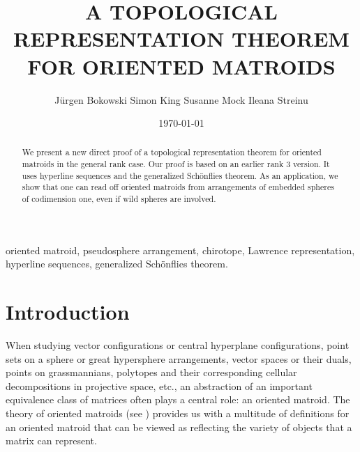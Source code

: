 \documentclass[a4paper]{amsart}
\theoremstyle{definition}
\theoremstyle{remark}
\begin{document}


\title{{\bf 
A TOPOLOGICAL REPRESENTATION THEOREM\\
 FOR ORIENTED MATROIDS\\}
}
\setcounter{footnote}{-1}
\author{
J\"urgen Bokowski \hspace{4mm} Simon King \hspace{4mm}  Susanne Mock
\hspace{4mm}
Ileana Streinu
} %

\date{\today}

\begin{abstract}
We present a new direct proof of 
a topological representation theorem for oriented matroids
in the general rank case. Our proof is based on an earlier rank 3 version.
It uses hyperline sequences and the generalized Sch{\"o}nflies theorem.
As an application, we show that one can read off oriented matroids
from arrangements of embedded spheres of codimension one, even if wild spheres are involved.
\end{abstract}

\maketitle

 oriented matroid, pseudosphere arrangement, 
chirotope, Lawrence representation, hyperline sequences, 
generalized Sch{\"o}nflies theorem.


\section{Introduction}
\label{introduction}

When studying vector configurations or central hyperplane configurations,
point sets on a sphere or great hypersphere arrangements, vector spaces
or their duals, points on grassmannians, polytopes and their corresponding
cellular decompositions in projective space, etc., an abstraction 
of an important equivalence class of matrices often plays a central
role: an oriented matroid.
%
The theory of oriented matroids (see \cite{bjorner}) 
provides us with a multitude of definitions
for an oriented matroid that can be viewed as
reflecting the variety of objects that a matrix can represent.
\end{document}
